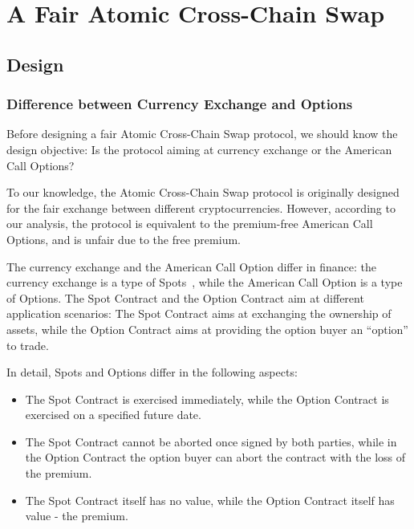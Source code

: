 \section{A Fair Atomic Cross-Chain Swap}
\label{sec:fair_atomic_swap}

\subsection{Design}


\subsubsection{Difference between Currency Exchange and Options}


Before designing a fair Atomic Cross-Chain Swap protocol, we should know the design objective:
Is the protocol aiming at currency exchange or the American Call Options?

To our knowledge, the Atomic Cross-Chain Swap protocol is originally designed for the fair exchange between different cryptocurrencies.
However, according to our analysis, the protocol is equivalent to the premium-free American Call Options, and is unfair due to the free premium.

The currency exchange and the American Call Option differ in finance: the currency exchange is a type of Spots~\cite{hull1991introduction}, while the American Call Option is a type of Options.
The Spot Contract and the Option Contract aim at different application scenarios: The Spot Contract aims at exchanging the ownership of assets, while the Option Contract aims at providing the option buyer an ``option'' to trade.

In detail, Spots and Options differ in the following aspects:

\begin{itemize}
    \item The Spot Contract is exercised immediately, while the Option Contract is exercised on a specified future date.
    \item The Spot Contract cannot be aborted once signed by both parties, while in the Option Contract the option buyer can abort the contract with the loss of the premium.
    \item The Spot Contract itself has no value, while the Option Contract itself has value - the premium.
\end{itemize}


